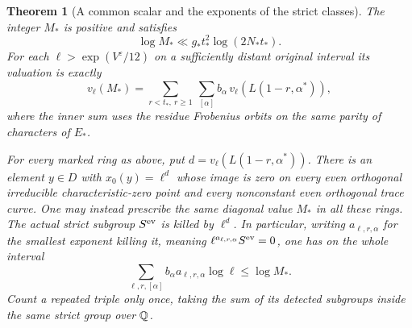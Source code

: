 \documentclass[a4paper,11pt]{article}
\newtheorem{theorem}[proposition]{Theorem}
\theoremstyle{definition}
\theoremstyle{remark}
\numberwithin{equation}{section}
\begin{document}
\begin{theorem}[A common scalar and the exponents of the strict classes]\leavevmode
\label{thm:simultaneous307}
The integer \(M_*\) is positive and satisfies
\[
             \log M_*\ll g_* t_*^2\log(2N_*t_*).
\]
For each \(\ell>\exp(V^\varepsilon/12)\) on a sufficiently
distant original interval its valuation is exactly
\[
      v_\ell(M_*)=
        \sum_{r<t_*,\ r\ge1}\ \sum_{[\alpha]}
                b_\alpha\,v_\ell(L(1-r,\alpha^*)),
\]
where the inner sum uses the residue Frobenius orbits on the
same parity of characters of \(E_*\).

For every marked ring as above, put
\(d=v_\ell(L(1-r,\alpha^*))\). There is an element \(y\in D\)
with \(x_0(y)=\ell^d\) whose image is zero on every even
orthogonal irreducible characteristic-zero point and every
nonconstant even orthogonal trace curve. One may instead
prescribe the same diagonal value \(M_*\) in all these rings.
The actual strict subgroup \(S^{\rm ev}\) is killed by
\(\ell^d\). In particular, writing \(a_{\ell,r,\alpha}\)
for the smallest exponent killing it, meaning
\(\ell^{a_{\ell,r,\alpha}}S^{\rm ev}=0\), one has on the
whole interval
\[
  \sum_{\ell,r,[\alpha]} b_\alpha a_{\ell,r,\alpha}\log\ell
                           \le\log M_* .
\]
Count a repeated triple only once, taking the sum of its
detected subgroups inside the same strict group over \(\mathbb Q\).
\end{theorem}
\end{document}
